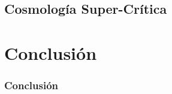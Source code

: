 \documentclass{beamer}
\begin{document}
\subsection{Cosmología Super-Crítica}
	\begin{frame}



	\end{frame}



\section{Conclusión}
	\begin{frame}
		\frametitle{Conclusión}


	\end{frame}
\end{document}
